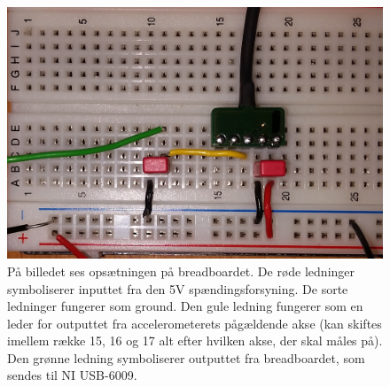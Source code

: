 \begin{figure}[H]
	\centering
	\includegraphics[scale=0.15]{figures/cProblemloesning/PF2.jpg}
	\caption{På billedet ses opsætningen på breadboardet. De røde ledninger symboliserer inputtet fra den 5V spændingsforsyning. De sorte ledninger fungerer som ground. Den gule ledning fungerer som en leder for outputtet fra accelerometerets pågældende akse (kan skiftes imellem række 15, 16 og 17 alt efter hvilken akse, der skal måles på). Den grønne ledning symboliserer outputtet fra breadboardet, som sendes til NI USB-6009.}
	\label{pforsoeg1}
\end{figure}

